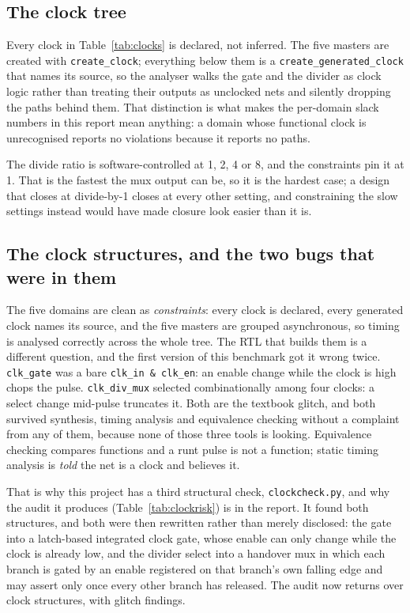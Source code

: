 \documentclass[11pt,a4paper]{article}
\begin{document}
\subsection{The clock tree}
\label{sec:clocktree}

Every clock in Table~\ref{tab:clocks} is declared, not inferred. The five
masters are created with \texttt{create\_clock}; everything below them is a
\texttt{create\_generated\_clock} that names its source, so the analyser walks
the gate and the divider as clock logic rather than treating their outputs as
unclocked nets and silently dropping the paths behind them. That distinction
is what makes the per-domain slack numbers in this report mean anything: a
domain whose functional clock is unrecognised reports no violations because it
reports no paths.

The divide ratio is software-controlled at 1, 2, 4 or 8, and the constraints
pin it at 1. That is the fastest the mux output can be, so it is the hardest
case; a design that closes at divide-by-1 closes at every other setting, and
constraining the slow settings instead would have made closure look easier
than it is.





\subsection{The clock structures, and the two bugs that were in them}

The five domains are clean as \emph{constraints}: every clock is declared,
every generated clock names its source, and the five masters are grouped
asynchronous, so timing is analysed correctly across the whole tree. The RTL
that builds them is a different question, and the first version of this
benchmark got it wrong twice. \texttt{clk\_gate} was a bare
\texttt{clk\_in \& clk\_en}: an enable change while the clock is high chops
the pulse. \texttt{clk\_div\_mux} selected combinationally among four clocks:
a select change mid-pulse truncates it. Both are the textbook glitch, and both
survived synthesis, timing analysis and equivalence checking without a
complaint from any of them, because none of those three tools is looking.
Equivalence checking compares functions and a runt pulse is not a function;
static timing analysis is \emph{told} the net is a clock and believes it.

That is why this project has a third structural check,
\texttt{clockcheck.py}, and why the audit it produces
(Table~\ref{tab:clockrisk}) is in the report. It found both structures, and
both were then rewritten rather than merely disclosed: the gate into a
latch-based integrated clock gate, whose enable can only change while the
clock is already low, and the divider select into a handover mux in which
each branch is gated by an enable registered on that branch's own falling
edge and may assert only once every other branch has released. The audit now
returns \clockverdict{} over \clockfindings{} clock structures, with
\clockglitchy{} glitch findings.
\end{document}
